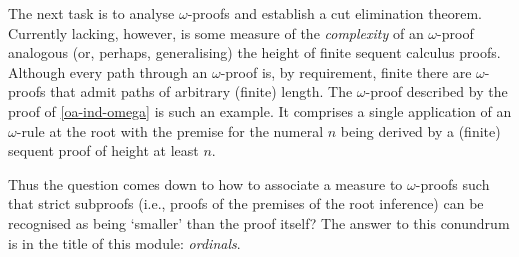 The next task is to analyse \( ω \)-proofs and establish a cut elimination theorem.
Currently lacking, however, is some measure of the \emph{complexity} of an \( ω \)-proof analogous (or, perhaps, generalising) the height of finite sequent calculus proofs.
Although every path through an \( ω \)-proof is, by requirement, finite there are \( ω \)-proofs that admit paths of arbitrary (finite) length.
The \( ω \)-proof described by the proof of \cref{oa-ind-omega} is such an example.
It comprises a single application of an \( ω \)-rule at the root with the premise for the numeral \( n \) being derived by a (finite) sequent proof of height at least \( n \).

Thus the question comes down to how to associate a measure to \( ω \)-proofs such that strict subproofs (i.e., proofs of the premises of the root inference) can be recognised as being ‘smaller’ than the proof itself?
The answer to this conundrum is in the title of this module: \emph{ordinals}.


